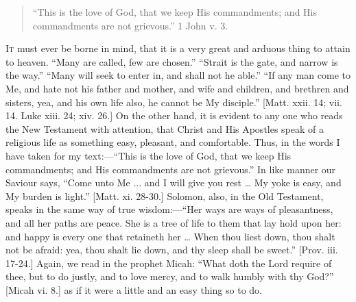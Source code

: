 
\begin{quote}

``This is the love of God, that we keep His
commandments; and His commandments are not
grievous.'' 1 John v. 3.

\end{quote}

I\textsc{t} must ever be borne in mind, that it is a very great
and arduous thing to attain to heaven. ``Many are
called, few are chosen.'' ``Strait is the gate,
and narrow is the way.'' ``Many will seek to
enter in, and shall not he able.'' ``If any man
come to Me, and hate not his father and mother, and wife
and children, and brethren and sisters, yea, and his own
life also, he cannot be My disciple.'' [Matt. xxii.
14; vii. 14. Luke xiii. 24; xiv. 26.] On the other hand,
it is evident to any one who reads the New Testament with
attention, that Christ and His Apostles speak of a
religious life as something easy, pleasant, and
comfortable. Thus, in the words I have taken for my
text:—``This is the love of God, that we keep
His commandments; and His commandments are not
grievous.'' In like manner our Saviour says,
``Come unto Me ... and I will give you rest … My
yoke is easy, and My burden is light.'' [Matt. xi.
28-30.] Solomon, also, in the Old Testament, speaks in
the same way of true wisdom:—``Her ways are ways
of pleasantness, and all her paths are peace. She is a
tree of life to them that lay hold upon her: and happy is
every one that retaineth her … When thou liest down,
thou shalt not be afraid: yea, thou shalt lie down, and
thy sleep shall be sweet.'' [Prov. iii. 17-24.]
Again, we read in the prophet Micah: ``What doth the
Lord require of thee, but to do justly, and to love
mercy, and to walk humbly with thy God?'' [Micah vi.
8.] as if it were a little and an easy thing so to do.

